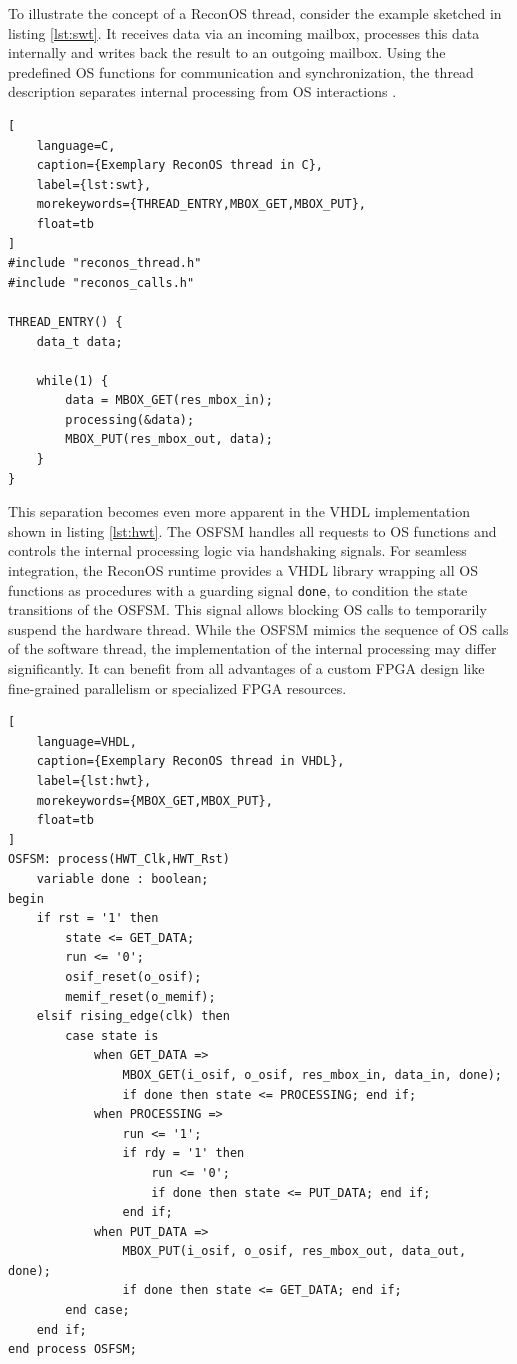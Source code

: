 To illustrate the concept of a ReconOS thread, consider the example sketched
in listing \ref{lst:swt}. It receives data via an incoming mailbox, processes
this data internally and writes back the result to an outgoing mailbox. Using
the predefined \ac{OS} functions for communication and synchronization, the
thread description separates internal processing from \ac{OS} interactions
\citep{AHK14}.
\begin{lstlisting}[
	language=C,
	caption={Exemplary ReconOS thread in C},
	label={lst:swt},
	morekeywords={THREAD_ENTRY,MBOX_GET,MBOX_PUT},
	float=tb
]
#include "reconos_thread.h"
#include "reconos_calls.h"

THREAD_ENTRY() {
	data_t data;

	while(1) {
		data = MBOX_GET(res_mbox_in);
		processing(&data);
		MBOX_PUT(res_mbox_out, data);
	}
}
\end{lstlisting}
This separation becomes even more apparent in the VHDL implementation shown in
listing \ref{lst:hwt}. The \ac{OSFSM} handles all requests to \ac{OS}
functions and controls the internal processing logic via handshaking signals.
For seamless integration, the ReconOS runtime provides a \ac{VHDL} library
wrapping all \ac{OS} functions as procedures with a guarding signal
\lstinline{done}, to condition the state transitions of the \ac{OSFSM}. This
signal allows blocking \ac{OS} calls to temporarily suspend the hardware
thread. While the \ac{OSFSM} mimics the sequence of \ac{OS} calls of the
software thread, the implementation of the internal processing may differ
significantly. It can benefit from all advantages of a custom \ac{FPGA} design
like fine-grained parallelism or specialized \ac{FPGA} resources.
\begin{lstlisting}[
	language=VHDL,
	caption={Exemplary ReconOS thread in VHDL},
	label={lst:hwt},
	morekeywords={MBOX_GET,MBOX_PUT},
	float=tb
]
OSFSM: process(HWT_Clk,HWT_Rst)
	variable done : boolean;
begin
	if rst = '1' then
		state <= GET_DATA;
		run <= '0';
		osif_reset(o_osif);
		memif_reset(o_memif);
	elsif rising_edge(clk) then
		case state is
			when GET_DATA =>
				MBOX_GET(i_osif, o_osif, res_mbox_in, data_in, done);
				if done then state <= PROCESSING; end if;
			when PROCESSING =>
				run <= '1';
				if rdy = '1' then
					run <= '0';
					if done then state <= PUT_DATA; end if;
				end if;
			when PUT_DATA =>
				MBOX_PUT(i_osif, o_osif, res_mbox_out, data_out, done);
				if done then state <= GET_DATA; end if;
		end case;
	end if;
end process OSFSM;
\end{lstlisting}

